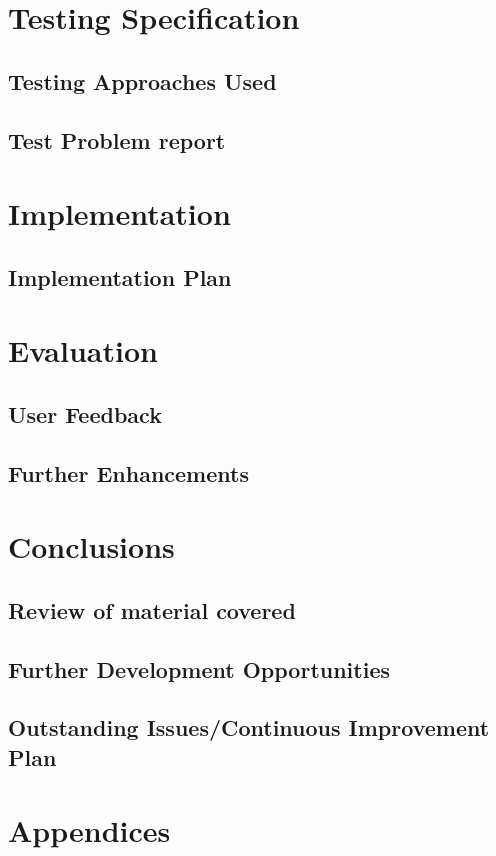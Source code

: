 \documentclass[a4paper]{article}
\begin{document}
\section {Testing Specification}
\subsection {Testing Approaches Used}
\subsection {Test Problem report}

\section {Implementation}
\subsection {Implementation Plan}

\section {Evaluation}
\subsection {User Feedback}
\subsection {Further Enhancements}

\section {Conclusions}
\subsection {Review of material covered }
\subsection {Further Development Opportunities}
\subsection {Outstanding Issues/Continuous Improvement Plan}

\section {Appendices}
\end{document}
